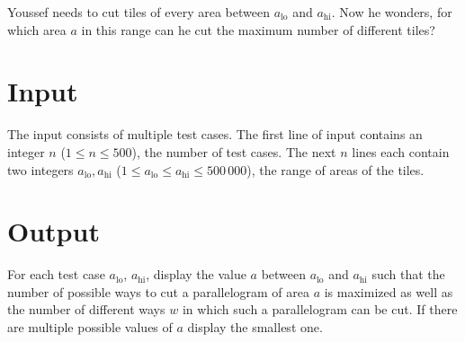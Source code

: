 Youssef needs to cut tiles of every area between $a_{\text{lo}}$ and
$a_{\text{hi}}$.  Now he wonders, for which area $a$ in this range can
he cut the maximum number of different tiles?

\section*{Input}

The input consists of multiple test cases.  The first line of input
contains an integer $n$ ($1 \le n \le 500$), the number of test
cases.  The next $n$ lines each contain two integers $a_{\text{lo}},
a_{\text{hi}}$ ($1 \le a_{\text{lo}} \le a_{\text{hi}} \le 500\,000$),
the range of areas of the tiles.

\section*{Output}

For each test case $a_{\text{lo}}$, $a_{\text{hi}}$, display the value $a$ between $a_{\text{lo}}$ and $a_{\text{hi}}$
such that the number of possible ways to cut a parallelogram of area
$a$ is maximized as well as the number of different ways $w$ in which such a
parallelogram can be cut.  If there are multiple possible values of
$a$ display the smallest one.
